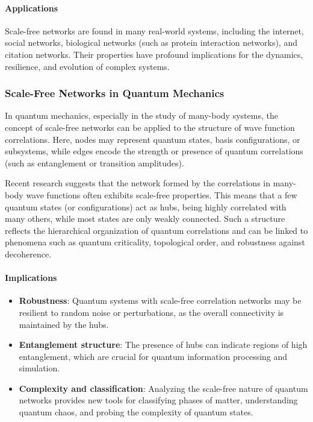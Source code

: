 \documentclass[a4paper, 11pt]{article}
\begin{document}
\paragraph{Applications}
Scale-free networks are found in many real-world systems, including the internet, social networks, biological networks (such as protein interaction networks), and citation networks. Their properties have profound implications for the dynamics, resilience, and evolution of complex systems.

\subsubsection{Scale-Free Networks in Quantum Mechanics}

In quantum mechanics, especially in the study of many-body systems, the concept of scale-free networks can be applied to the structure of wave function correlations. Here, nodes may represent quantum states, basis configurations, or subsystems, while edges encode the strength or presence of quantum correlations (such as entanglement or transition amplitudes).

Recent research suggests that the network formed by the correlations in many-body wave functions often exhibits scale-free properties. This means that a few quantum states (or configurations) act as hubs, being highly correlated with many others, while most states are only weakly connected. Such a structure reflects the hierarchical organization of quantum correlations and can be linked to phenomena such as quantum criticality, topological order, and robustness against decoherence.

\paragraph{Implications}
\begin{itemize}
    \item \textbf{Robustness}: Quantum systems with scale-free correlation networks may be resilient to random noise or perturbations, as the overall connectivity is maintained by the hubs.
    \item \textbf{Entanglement structure}: The presence of hubs can indicate regions of high entanglement, which are crucial for quantum information processing and simulation.
    \item \textbf{Complexity and classification}: Analyzing the scale-free nature of quantum networks provides new tools for classifying phases of matter, understanding quantum chaos, and probing the complexity of quantum states.
\end{itemize}
\end{document}
